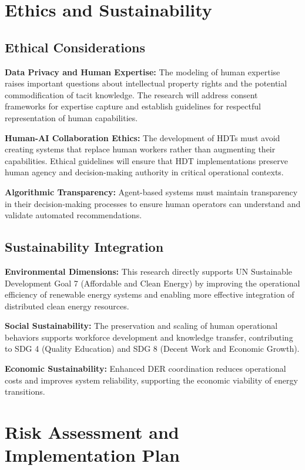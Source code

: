 \documentclass[12pt,a4paper]{article}
\begin{document}
\section{Ethics and Sustainability}
\label{sec:ethics}

\subsection{Ethical Considerations}

\noindent \textbf{Data Privacy and Human Expertise:} The modeling of human expertise raises important questions about intellectual property rights and the potential commodification of tacit knowledge. The research will address consent frameworks for expertise capture and establish guidelines for respectful representation of human capabilities.

\noindent \textbf{Human-AI Collaboration Ethics:} The development of HDTs must avoid creating systems that replace human workers rather than augmenting their capabilities. Ethical guidelines will ensure that HDT implementations preserve human agency and decision-making authority in critical operational contexts.

\noindent \textbf{Algorithmic Transparency:} Agent-based systems must maintain transparency in their decision-making processes to ensure human operators can understand and validate automated recommendations.

\subsection{Sustainability Integration}

\noindent \textbf{Environmental Dimensions:} This research directly supports UN Sustainable Development Goal 7 (Affordable and Clean Energy) by improving the operational efficiency of renewable energy systems and enabling more effective integration of distributed clean energy resources.

\noindent \textbf{Social Sustainability:} The preservation and scaling of human operational behaviors supports workforce development and knowledge transfer, contributing to SDG 4 (Quality Education) and SDG 8 (Decent Work and Economic Growth).

\noindent \textbf{Economic Sustainability:} Enhanced DER coordination reduces operational costs and improves system reliability, supporting the economic viability of energy transitions.

\section{Risk Assessment and Implementation Plan}
\label{sec:risks}
\end{document}
